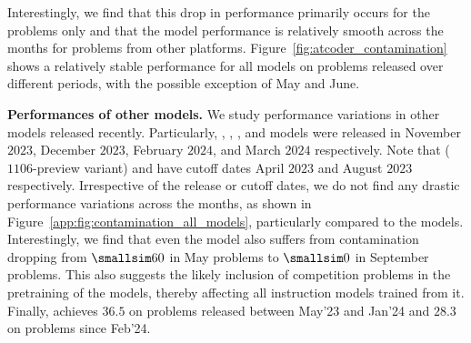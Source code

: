 Interestingly, we find that this drop in performance primarily occurs for the \leetcode{} problems only and that the model performance is relatively smooth across the months for problems from other platforms. Figure~\ref{fig:atcoder_contamination} shows a relatively stable performance for all models on \atcoder{} problems released over different periods, with the possible exception of May and June. %





\vspace{1pt}
\noindent \textbf{Performances of other models.}
We study performance variations in other models released recently.
Particularly, \gptfourturbo{}, \geminipro{}, \mistrallarge{}, and \claudethrees{} models were released in November $2023$, December $2023$, February $2024$, and March $2024$ respectively.
Note that \gptfourturbo{} ($1106$-preview variant) and \claudethrees{} have cutoff dates April $2023$ and August $2023$ respectively.
Irrespective of the release or cutoff dates, we do not find any drastic performance variations across the months, as shown in Figure~\ref{app:fig:contamination_all_models}, particularly compared to the \deepseek{} models.
Interestingly, we find that even the  model also suffers from contamination dropping from  $\smallsim 60$ in May problems to  $\smallsim 0$ in September \leetcode{} problems. 
This also suggests the likely inclusion of competition problems in the pretraining of the \deepseek{} models, thereby affecting all instruction models trained from it.
Finally, \codestral{} achieves  $36.5$ on problems released between May'23 and Jan'24 and  $28.3$ on problems since Feb'24.


